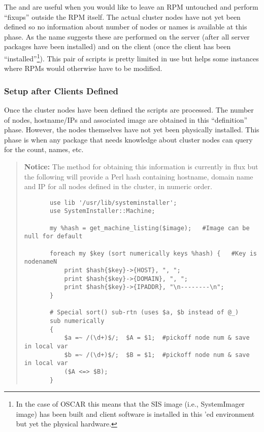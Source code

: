 The  and 
are useful when you would like to leave an RPM untouched and perform
``fixups'' outside the RPM itself.  The actual cluster nodes have not yet
been defined so no information about number of nodes or names is available
at this phase.  As the name suggests these are performed on the server
(after all server packages have been installed) and on the client (once the
client has been ``installed''\footnote{In the case of OSCAR this means that
the SIS image (i.e., SystemImager image) has been built and client software
is installed in this 'ed environment but yet the physical
hardware.}).  This pair of scripts is pretty limited in use but helps
some instances where RPMs would otherwise have to be modified.



\subsubsection{Setup after Clients Defined}

Once the cluster nodes have been defined the  scripts
are processed.  The number of nodes, hostname/IPs and associated image are
obtained in this ``definition'' phase.  However, the nodes themselves have
not yet been physically installed.  This  phase is when
any package that needs knowledge about cluster nodes can query for the
count, names, etc.  

\begin{verse}
   {\bfseries Notice: } The method for obtaining this information is
   currently in flux but the following will provide a Perl hash containing
   hostname,  domain name and IP for all nodes defined in the cluster, in
   numeric order.
  \begin{footnotesize}
  \begin{verbatim}
       use lib '/usr/lib/systeminstaller';
       use SystemInstaller::Machine;

       my %hash = get_machine_listing($image);   #Image can be null for default

       foreach my $key (sort numerically keys %hash) {   #Key is nodenameN
           print $hash{$key}->{HOST}, ", ";
           print $hash{$key}->{DOMAIN}, ", ";
           print $hash{$key}->{IPADDR}, "\n--------\n";
       }

       # Special sort() sub-rtn (uses $a, $b instead of @_)
       sub numerically 
       {
           $a =~ /(\d+)$/;  $A = $1;  #pickoff node num & save in local var
           $b =~ /(\d+)$/;  $B = $1;  #pickoff node num & save in local var
           ($A <=> $B);
       }
  \end{verbatim}
  \end{footnotesize}
\end{verse}



